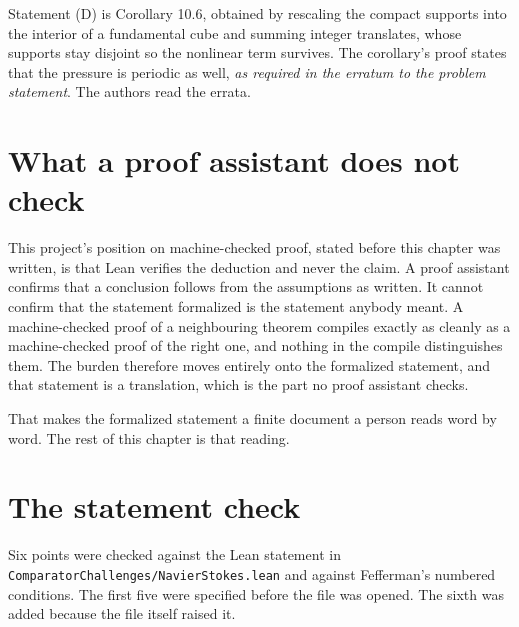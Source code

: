 Statement (D) is Corollary 10.6, obtained by rescaling the compact supports into the interior of a
fundamental cube and summing integer translates, whose supports stay disjoint so the nonlinear term
survives. The corollary's proof states that the pressure is periodic as well, \emph{as required in
the erratum to the problem statement}. The authors read the errata.

\section{What a proof assistant does not check}

This project's position on machine-checked proof, stated before this chapter was written, is that
Lean verifies the deduction and never the claim. A proof assistant confirms that a conclusion
follows from the assumptions as written. It cannot confirm that the statement formalized is the
statement anybody meant. A machine-checked proof of a neighbouring theorem compiles exactly as
cleanly as a machine-checked proof of the right one, and nothing in the compile distinguishes them.
The burden therefore moves entirely onto the formalized statement, and that statement is a
translation, which is the part no proof assistant checks.

That makes the formalized statement a finite document a person reads word by word. The rest of this
chapter is that reading.

\section{The statement check}

Six points were checked against the Lean statement in
\texttt{ComparatorChallenges/\allowbreak{}NavierStokes.\allowbreak{}lean} and against Fefferman's
numbered conditions. The first five were specified before the file was opened. The sixth was added
because the file itself raised it.


